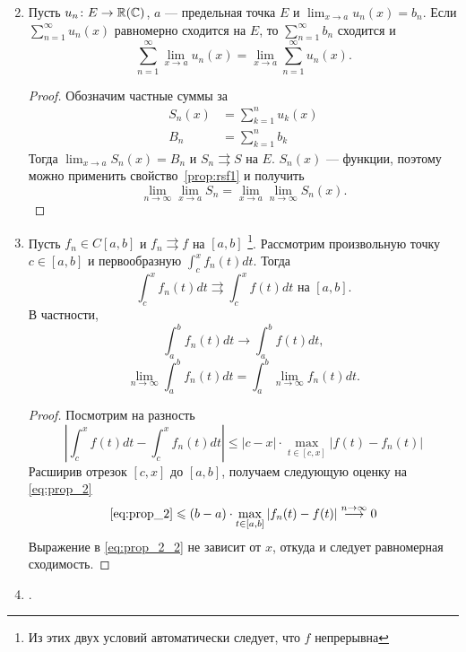 \begin{enumerate}
	\setcounter{enumi}{1}
\item Пусть $ u_n \colon E \to  \R(\Cm)$, $ a$ --- предельная точка $ E$ и $ \lim_{x \to  a} u_n(x) = b_n$. Если $ \sum_{n=1}^{\infty}u_n(x) $ равномерно сходится на $ E$, то   $ \sum_{n=1}^{\infty} b_n$ сходится и
	\[
		\sum_{n=1}^{\infty}  \lim_{x \to  a} u_n(x) = \lim_{x \to  a} \sum_{n=1}^{\infty} u_n(x)
	.\]
	\begin{proof}
		Обозначим частные суммы за
		\[
			\begin{aligned}
				S_n(x) &= \sum_{k=1}^{n} u_k(x) \\
				B_n &= \sum_{k=1}^{n} b_k
			\end{aligned}
		\]
		Тогда $ \lim_{x \to  a} S_n(x) = B_n$ и $ S_n \rightrightarrows S$ на $ E$.  $ S_n(x)$ --- функции, поэтому можно применить свойство~\ref{prop:rsf1} и получить
		\[
			\lim_{n \to \infty} \lim_{x \to a} S_n = \lim_{x \to a} \lim_{n \to \infty} S_n(x)
		.\]
	\end{proof}
\item Пусть  $ f_n \in C[a, b]$ и $ f_{n} \rightrightarrows f$ на $ [a, b]$ \footnote{Из этих двух условий автоматически следует, что $ f$ непрерывна}. Рассмотрим произвольную точку  $ c \in [a, b]$ и первообразную $ \int_{c}^{x} f_{n}(t)dt $. Тогда 
	\[
		\int_{c}^{x} f_n(t)dt \rightrightarrows \int_{c}^{x} f(t)dt \text{ на } [a, b]  
	.\] 
	В частности,
	\[
		\int_{a}^{b} f_n(t)dt \to \int_{a}^{b} f(t) dt  
	,\] 
	\[
		\lim_{n \to \infty} \int_{a}^{b} f_n(t)dt = \int_{a}^{b} \lim_{n \to \infty} f_n(t)dt  
	.\] 
	\begin{proof}
	    Посмотрим на разность 
		\begin{equation}\label{eq:prop_2}
			\left| \int_{c}^{x} f(t) dt - \int_{c}^{x} f_n(t) dt   \right| \le \left| c  - x \right| \cdot \max_{t \in [c, x]} \left| f(t) - f_n(t) \right| 
		\end{equation}
		Расширив отрезок $ [c, x]$ до $ [a, b]$, получаем следующую оценку на \ref{eq:prop_2}
		\begin{equation}\label{eq:prop_2_2}
			\ref{eq:prop_2} \le (b-a) \cdot \max_{t \in [a, b]}\left| f_n(t) - f(t) \right| \stackrel{n \to  \infty}{\longrightarrow} 0
		\end{equation}
		Выражение в \ref{eq:prop_2_2} не зависит от $ x$, откуда и следует равномерная сходимость.
	\end{proof}
\item {}.

\end{enumerate}

